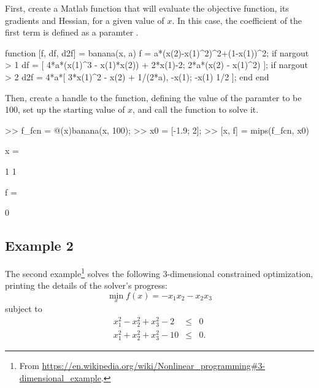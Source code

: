 \documentclass[12pt]{article}
\newcommand{\matlab}[0]{{\sc Matlab}}
\newcommand{\code}[1]{{\relsize{-0.5}{\tt{{#1}}}}}  %
\numberwithin{equation}{section}
\numberwithin{table}{section}
\numberwithin{figure}{section}
\begin{document}
First, create a \matlab{} function that will evaluate the objective function, its gradients and Hessian, for a given value of $x$. In this case, the coefficient of the first term is defined as a paramter \code{a}.
\begin{Code}
function [f, df, d2f] = banana(x, a)
f = a*(x(2)-x(1)^2)^2+(1-x(1))^2;
if nargout > 1          %
    df = [  4*a*(x(1)^3 - x(1)*x(2)) + 2*x(1)-2;
            2*a*(x(2) - x(1)^2)                     ];
    if nargout > 2      %
        d2f = 4*a*[ 3*x(1)^2 - x(2) + 1/(2*a),  -x(1);
                    -x(1)                       1/2 ];
    end
end
\end{Code}
Then, create a handle to the function, defining the value of the paramter \code{a} to be 100, set up the starting value of $x$, and call the \code{mips} function to solve it.
\begin{Code}
>> f_fcn = @(x)banana(x, 100);
>> x0 = [-1.9; 2];
>> [x, f] = mips(f_fcn, x0)

x =

     1
     1


f =

     0

\end{Code}


\subsection{Example 2}
\label{sec:ex2}

The second example\footnote{From \url{https://en.wikipedia.org/wiki/Nonlinear\_programming\#3-dimensional\_example}.} solves the following 3-dimensional constrained optimization, printing the details of the solver's progress:
\begin{equation}
\min_x f(x) = -x_1 x_2 - x_2 x_3
\end{equation}
subject to
\begin{eqnarray}
x_1^2 - x_2^2 + x_3^2 - 2 & \le & 0 \\
x_1^2 + x_2^2 + x_3^2 - 10 & \le & 0.
\end{eqnarray}
\end{document}
